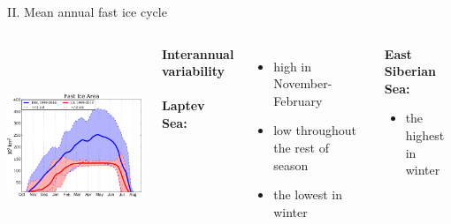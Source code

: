 \documentclass[8pt]{beamer}
\begin{document}
\setwatermark{\fontsize{125pt}{125pt}\selectfont{}}
\begin{frame}[fragile]{II. Mean annual fast ice cycle}
	\begin{columns}
			\includegraphics[height=6cm]{./img/Mean_SeasonalCycle_ESSvsSELS.pdf}\\
			\begin{center}
				\textbf{Interannual variability}\\~\\
				\textbf{Laptev Sea:}
			\end{center}
				\begin{itemize}
					\item high in November-February
					\item low throughout the rest of season
					\item the lowest in winter
			\end{itemize}
			
			\begin{center}
				\textbf{East Siberian Sea:}
				\begin{itemize}
					\item the highest  in winter
				\end{itemize}
			\end{center}
	\end{columns}
	
\end{frame}
\end{document}
